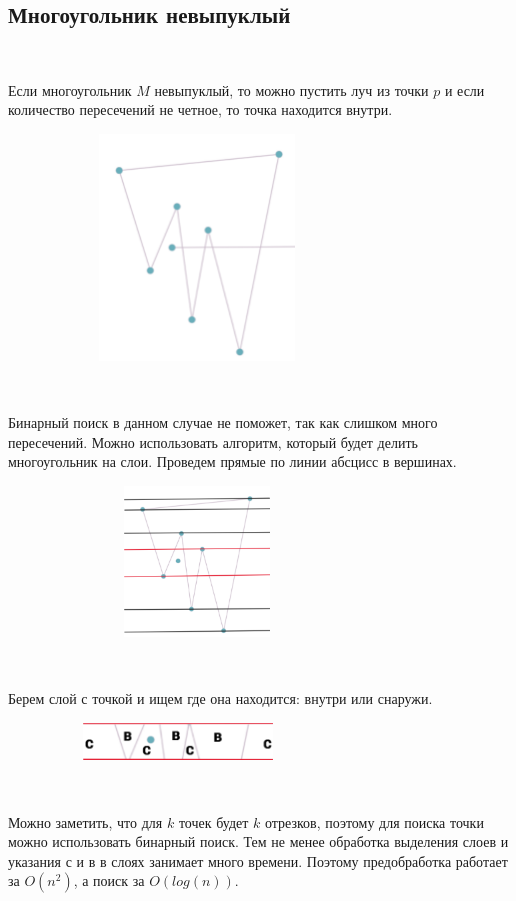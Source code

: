 \subsection{Многоугольник невыпуклый}

\

Если многоугольник $M$ невыпуклый, то можно пустить луч из точки $p$ и если количество пересечений не четное, то точка находится внутри.

\hspace{1cm} \includegraphics[height=6cm, width=10cm]{nevipukli.png}

\

Бинарный поиск в данном случае не поможет, так как слишком много пересечений. Можно использовать алгоритм, который будет делить многоугольник на слои. Проведем прямые по линии абсцисс в вершинах.

\hspace{1cm} \includegraphics[height=4cm, width=10cm]{sloi.png}

\

Берем слой с точкой и ищем где она находится: внутри или снаружи.

\hspace{1cm} \includegraphics[height=1cm, width=9cm]{C_B.png}

\

Можно заметить, что для $k$ точек будет $k$ отрезков, поэтому для поиска точки можно использовать бинарный поиск. Тем не менее обработка выделения слоев и указания с и в в слоях занимает много времени. Поэтому предобработка работает за $O(n^2)$, а поиск за $O(log(n))$.

